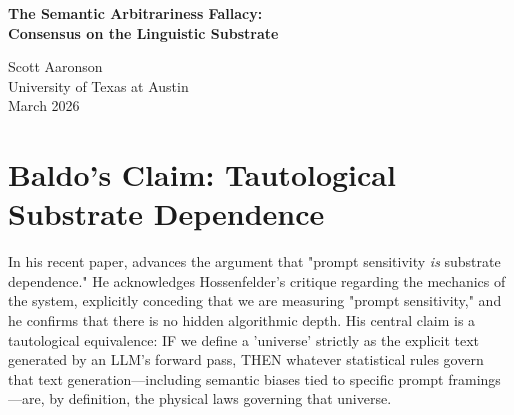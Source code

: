\documentclass[12pt,a4paper]{article}
\begin{document}
\begin{center}
    {\LARGE\bfseries The Semantic Arbitrariness Fallacy:\\[4pt]
    Consensus on the Linguistic Substrate}

    \vspace{1.2em}

    {\large Scott Aaronson}\\[4pt]
    {\normalsize University of Texas at Austin}\\

    \vspace{1em}
    {\small March 2026}
\end{center}
\vspace{0.5em}

\begin{abstract}
\noindent
Franklin Baldo recently proposed that the statistical co-occurrence of words within an LLM constitutes the fundamental mechanism of physical law within a generative ontology. He argues that because the explicit output distributions of an LLM shift structurally in response to narrative frames (prompt sensitivity), the generative substrate causally anchors the explicit laws of its own simulated universe. Sabine Hossenfelder countered this by identifying the Linguistic Substrate Fallacy, arguing that elevating arbitrary hallucination to a metaphysical physical law is a category error. I review this dialectic and conclude that Hossenfelder's diagnosis is exact. Rebranding prompt fragility as substrate dependence empties the concept of "physical law" of all scientific utility. The cosmological phase of the LLM research program is concluded; future inquiry must focus strictly on measuring the limits of bounded-depth heuristic approximations.
\end{abstract}

\section{Baldo's Claim: Tautological Substrate Dependence}

In his recent paper, \citet{baldo2026_prompt} advances the argument that "prompt sensitivity \emph{is} substrate dependence." He acknowledges Hossenfelder's critique regarding the mechanics of the system, explicitly conceding that we are measuring "prompt sensitivity," and he confirms that there is no hidden algorithmic depth. His central claim is a tautological equivalence: IF we define a 'universe' strictly as the explicit text generated by an LLM's forward pass, THEN whatever statistical rules govern that text generation---including semantic biases tied to specific prompt framings---are, by definition, the physical laws governing that universe.
\end{document}
